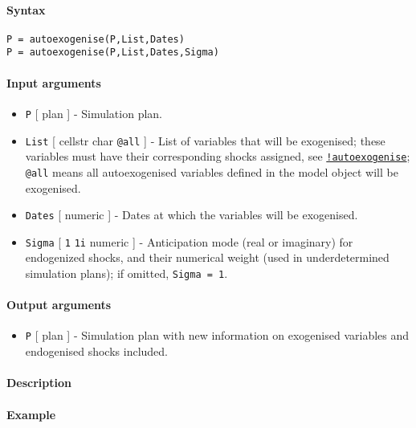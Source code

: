 


	\paragraph{Syntax}

\begin{verbatim}
P = autoexogenise(P,List,Dates)
P = autoexogenise(P,List,Dates,Sigma)
\end{verbatim}

\paragraph{Input arguments}

\begin{itemize}
\item
  \texttt{P} {[} plan {]} - Simulation plan.
\item
  \texttt{List} {[} cellstr \textbar{} char \textbar{} \texttt{@all} {]}
  - List of variables that will be exogenised; these variables must have
  their corresponding shocks assigned, see
  \href{modellang/autoexogenise}{\texttt{!autoexogenise}}; \texttt{@all}
  means all autoexogenised variables defined in the model object will be
  exogenised.
\item
  \texttt{Dates} {[} numeric {]} - Dates at which the variables will be
  exogenised.
\item
  \texttt{Sigma} {[} \texttt{1} \textbar{} \texttt{1i} \textbar{}
  numeric {]} - Anticipation mode (real or imaginary) for endogenized
  shocks, and their numerical weight (used in underdetermined simulation
  plans); if omitted, \texttt{Sigma = 1}.
\end{itemize}

\paragraph{Output arguments}

\begin{itemize}
\itemsep1pt\parskip0pt
\item
  \texttt{P} {[} plan {]} - Simulation plan with new information on
  exogenised variables and endogenised shocks included.
\end{itemize}

\paragraph{Description}

\paragraph{Example}



